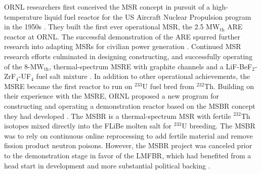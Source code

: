 \gls{ORNL} researchers first conceived the \gls{MSR} concept in pursuit of a high-temperature
liquid fuel reactor for the US Aircraft Nuclear Propulsion program in
the 1950s \cite{rosenthal_molten-salt_1970}. They
built the first ever operational \gls{MSR}, the 2.5 MW$_{\text{th}}$
\gls{ARE} reactor at \gls{ORNL}. The successful demonstration of the \gls{ARE} spurred further
research into adapting \glspl{MSR} for civilian power generation \cite{rosenthal_molten-salt_1970}.
Continued \gls{MSR} research efforts culminated in designing constructing, and successfully
operating of the 8-MW$_{\text{th}}$, thermal-spectrum \gls{MSRE} with
graphite channels and a LiF-BeF$_2$-ZrF$_4$-UF$_4$ fuel salt mixture
\cite{haubenreich_experience_1970}. In addition to other operational achievements, the
\gls{MSRE} became the first reactor to run on $^{233}$U fuel bred from $^{232}$Th. Building on
their experience with the \gls{MSRE}, \gls{ORNL} proposed a new program for constructing and
operating a demonstration reactor based on the \gls{MSBR} concept they had developed
\cite{macpherson_molten_1985}. The \gls{MSBR} is a thermal-spectrum \gls{MSR} with fertile
$^{232}$Th isotopes mixed directly into the \gls{FLiBe} molten salt for $^{233}$U breeding. The
\gls{MSBR} was to rely on continuous online reprocessing to add fertile
material and remove fission product neutron poisons.
However, the \gls{MSBR} project was canceled prior to the demonstration stage in
favor of the \gls{LMFBR}, which had benefited from a head start in development and more substantial
political backing \cite{macpherson_molten_1985}.

